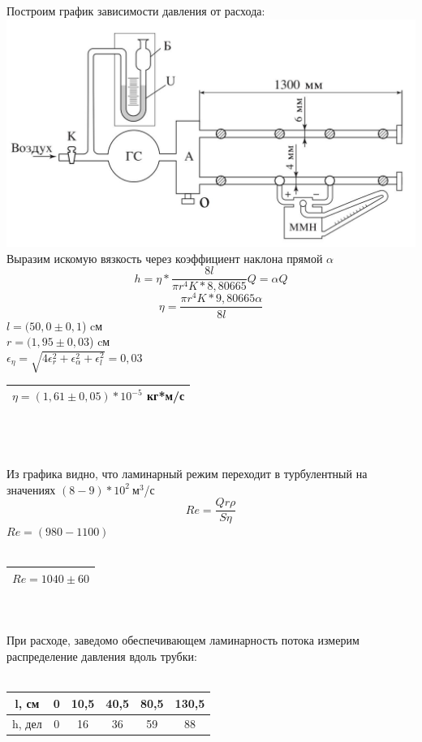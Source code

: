 \documentclass[11pt]{article}
\begin{document}
Построим график зависимости давления от расхода:\\
\includegraphics[scale=0.7]{asd.png}
Выразим искомую вязкость через коэффициент наклона прямой $\alpha$
$$h=\eta*\frac{8l}{\pi r^4K*8,80665}Q=\alpha Q$$
$$\eta = \frac{\pi r^4 K*9,80665 \alpha}{8l}$$
$l=(50,0\pm0,1$) cм \\
$r=(1,95\pm0,03$) cм \\
$\epsilon_\eta = \sqrt{4\epsilon_r^2+\epsilon_\alpha^2+\epsilon_l^2}=0,03$\\
\begin{tabular}{|c|}
\hline 
$\eta =(1,61\pm0,05)*10^{-5}$ кг*м/с \\ 
\hline 
\end{tabular} 
\ \\
\ \\
\ \\
Из графика видно, что ламинарный режим переходит в турбулентный на значениях $(8-9)*10^2 \ $м$^3$/с
$$Re=\frac{Qr\rho}{S\eta}$$
$Re=(980-1100)$
\ \\
\ \\
\begin{tabular}{|c|}
\hline 
$Re=1040\pm60$\\ 
\hline 
\end{tabular}
\ \\
\ \\
При расходе, заведомо обеспечивающем ламинарность потока измерим распределение давления вдоль трубки:\\
\ \\
\begin{tabular}{|c|c|c|c|c|c|}
\hline 
l, см & 0 & 10,5 & 40,5 & 80,5 & 130,5 \\ 
\hline 
h, дел & 0 & 16 & 36 & 59 & 88 \\ 
\hline 
\end{tabular} 
\end{document}
